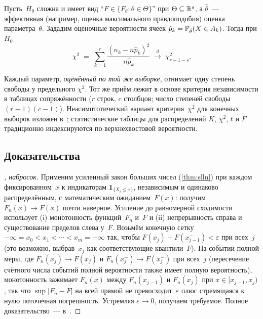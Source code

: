 \begin{theorem}
\label{thm:cramer-parametric}
Пусть~$H_0$ сложна и имеет вид ``$F \in \{F_\theta : \theta \in \Theta\}$'' при $\Theta \subseteq \mathbb{R}^s$, а $\hat \theta$~--- эффективная (например, оценка максимального правдоподобия) оценка параметра~$\theta$. Зададим оценочные вероятности ячеек $\hat p_k = \mathbb{P}_{\hat \theta}(X \in A_k)$. Тогда при $H_0$
\[
  \chi^2 \;=\; \sum_{k=1}^{r} \frac{(n_k - n \hat p_k)^2}{n \hat p_k} \;\xrightarrow{d}\; \chi^2_{r - 1 - s}.
\]
\end{theorem}

\begin{remark}
Каждый параметр, \emph{оценённый по той же выборке}, отнимает одну степень свободы у предельного $\chi^2$. Тот же приём лежит в основе критерия независимости в таблицах сопряжённости ($r$ строк, $c$ столбцов; число степеней свободы $(r - 1)(c - 1)$). Неасимптотический вариант критерия~$\chi^2$ для конечных выборок изложен в~\cite[гл.~VIII]{Sevastyanov1982}; статистические таблицы для распределений $K$, $\chi^2$, $t$ и $F$ традиционно индексируются по верхнехвостовой вероятности.
\end{remark}

\subsection*{Доказательства}

\begin{proof}[, набросок]
Применим усиленный закон больших чисел (\cref{thm:slln}) при каждом фиксированном~$x$ к индикаторам $\mathbf{1}_{\{X_i \leq x\}}$, независимым и одинаково распределённым, с математическим ожиданием~$F(x)$: получим $F_n(x) \to F(x)$ почти наверное. Усиление до равномерной сходимости использует (i) монотонность функций~$F_n$ и~$F$ и (ii) непрерывность справа и существование пределов слева у~$F$. Возьмём конечную сетку $-\infty = x_0 < x_1 < \cdots < x_m = +\infty$ так, чтобы $F(x_j) - F(x_{j-1}^{-}) < \varepsilon$ при всех~$j$ (это возможно, выбрав~$x_j$ как соответствующие квантили~$F$). На событии полной меры, где $F_n(x_j) \to F(x_j)$ и $F_n(x_j^-) \to F(x_j^-)$ при всех~$j$ (пересечение счётного числа событий полной вероятности также имеет полную вероятность), монотонность зажимает $F_n(x)$ между $F_n(x_{j-1})$ и $F_n(x_j)$ при $x \in [x_{j-1}, x_j)$, так что $\sup |F_n - F|$ на всей прямой не превосходит~$\varepsilon$ плюс стремящаяся к нулю поточечная погрешность. Устремляя $\varepsilon \to 0$, получаем требуемое. Полное доказательство~--- в~\cite[гл.~II, \S~10]{Shiryaev1989}.
\end{proof}

